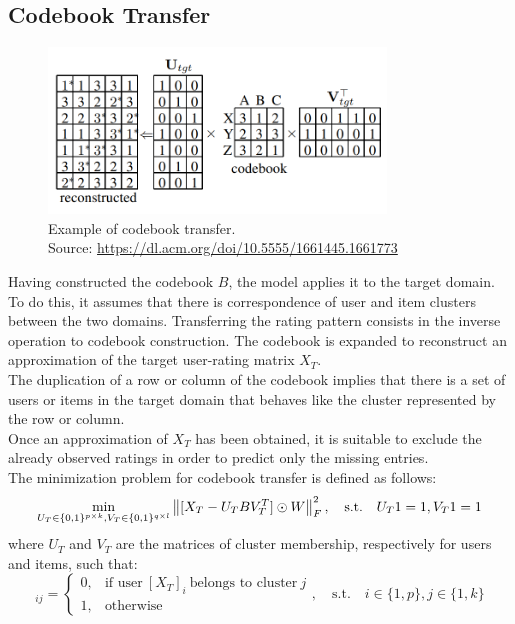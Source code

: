 \subsection{Codebook Transfer}
\label{ss:codebook-transfer}

\begin{figure}[hbt]
\centering
\includegraphics[width=0.8\textwidth]{pictures/codebook-transfer}
\caption{Example of codebook transfer.\\
Source: \url{https://dl.acm.org/doi/10.5555/1661445.1661773}}
\end{figure}
Having constructed the codebook $B$, the model applies it to the target domain. To do this, it assumes that there is correspondence of user and item clusters between the two domains. Transferring the rating pattern consists in the inverse operation to codebook construction. The codebook is expanded to reconstruct an approximation of the target user-rating matrix $X_T$.\\
The duplication of a row or column of the codebook implies that there is a set of users or items in the target domain that behaves like the cluster represented by the row or column.\\
Once an approximation of $X_T$ has been obtained, it is suitable to exclude the already observed ratings in order to predict only the missing entries.\\
The minimization problem for codebook transfer is defined as follows:
\begin{equation}
\min_{U_T \in \{0,1\}^{p \times k}, V_T \in \{0,1\}^{q \times l}} \left\lVert[X_T - U_T B V_T^T] \odot W\right\rVert_F^2, \quad \text{s.t.} \quad U_T 1 = 1, V_T 1 = 1
\end{equation}
where $U_T$ and $V_T$ are the matrices of cluster membership, respectively for users and items, such that:
\begin{equation}
[U_T]_{ij} =
\begin{cases}
0, & \text{if user}\ [X_T]_{i}\ \text{belongs to cluster}\ j\\
1, & \text{otherwise}
\end{cases}
, \quad \text{s.t.} \quad i \in \{1,p\}, j \in \{1,k\}
\end{equation}
